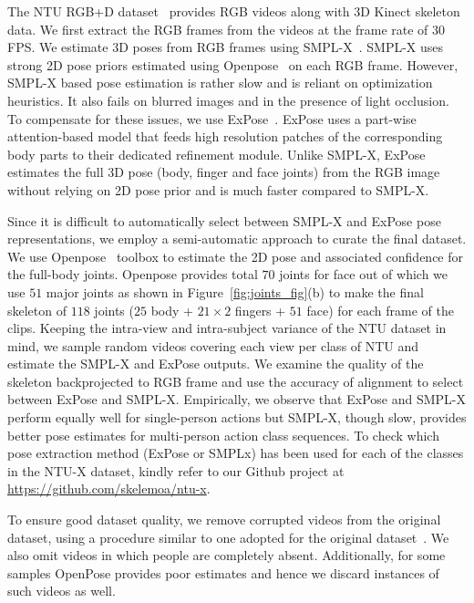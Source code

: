 \documentclass[sigconf,screen,prologue,table,dvipsnames]{acmart}
\begin{document}
The NTU RGB+D dataset~\cite{Shahroudy_2016_CVPR} provides RGB videos along with 3D Kinect skeleton data. We first extract the RGB frames from the videos at the frame rate of 30 FPS. We estimate 3D poses from RGB frames using SMPL-X~\cite{SMPL-X:2019}. SMPL-X uses strong 2D pose priors estimated using Openpose~\cite{cao2018openpose} on each RGB frame. However, SMPL-X based pose estimation is rather slow and is reliant on optimization heuristics. It also fails on blurred images and in the presence of light occlusion. To compensate for these issues, we use ExPose~\cite{ExPose:2020}. ExPose uses a part-wise attention-based model that feeds high resolution patches of the corresponding body parts to their dedicated refinement module. Unlike SMPL-X, ExPose estimates the full 3D pose (body, finger and face joints) from the RGB image without relying on 2D pose prior and is much faster compared to SMPL-X.

Since it is difficult to automatically select between SMPL-X and ExPose pose representations, we employ a semi-automatic approach to curate the final dataset. We use Openpose~\cite{cao2018openpose} toolbox to estimate the 2D pose and associated confidence for the full-body joints. Openpose provides total $70$ joints for face out of which we use $51$ major joints as shown in Figure~\ref{fig:joints_fig}(b) to make the final skeleton of $118$ joints ($25$ body + $21 \times 2$ fingers + $51$ face) for each frame of the clips. Keeping the intra-view and intra-subject variance of the NTU dataset in mind, we sample random videos covering each view per class of NTU and estimate the SMPL-X and ExPose outputs. We examine the quality of the skeleton backprojected to RGB frame and use the accuracy of alignment to select between ExPose and SMPL-X. Empirically, we observe that ExPose and SMPL-X perform equally well for single-person actions but SMPL-X, though slow, provides better pose estimates for multi-person action class sequences. To check which pose extraction method (ExPose or SMPLx) has been used for each of the classes in the NTU-X dataset, kindly refer to our Github project at \url{https://github.com/skelemoa/ntu-x}.


To ensure good dataset quality, we remove corrupted videos from the original dataset, using a procedure similar to one adopted for the original dataset~\cite{Shahroudy_2016_CVPR}. We also omit videos in which people are completely absent. Additionally, for some  samples  OpenPose provides poor estimates and hence we discard instances of such videos as well.
\end{document}
